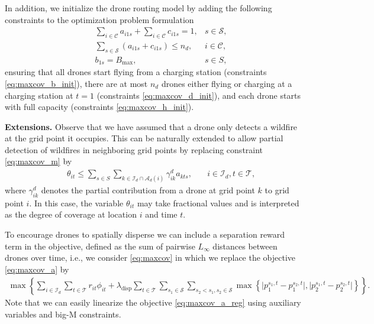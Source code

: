 \documentclass{article}
\newcommand{\set}[1]{\mathcal{#1}}
\begin{document}
In addition, we initialize the drone routing model by adding the following constraints to the optimization problem formulation
\begin{align}
    &\quad \displaystyle \sum_{i \in \set C} a_{i1s} + \sum_{i \in \set C} c_{i1s} = 1, &  s \in \set S, \label{eq:maxcov_b_init}\\
    &\quad \displaystyle \sum_{s \in \set S} (a_{i1s} + c_{i1s}) \leq n_d, & i \in \set C, \label{eq:maxcov_d_init}\\
    &\quad \displaystyle b_{1s} = B_{\text{max}}, & s \in S, \label{eq:maxcov_h_init}
\end{align}
ensuring that all drones start flying from a charging station (constraints \eqref{eq:maxcov_b_init}), there are at most $n_d$ drones either flying or charging at a charging station at $t = 1$ (constraints \eqref{eq:maxcov_d_init}), and each drone starts with full capacity (constraints \eqref{eq:maxcov_h_init}). 

\textbf{Extensions.}
Observe that we have assumed that a drone only detects a wildfire at the grid point it occupies. This can be naturally extended to allow partial detection of wildfires in neighboring grid points by replacing constraint \eqref{eq:maxcov_m} by 
\begin{align*}
            &\quad \displaystyle \theta_{it} \leq \sum_{s \in S} \sum_{k \in \set I_d \cap \set A_d(i)}\gamma_{ik}^d a_{kts}, &\quad i \in \set I_d, t \in \set T,
\end{align*}
where $\gamma_{ik}^d$ denotes the partial contribution from a drone at grid point $k$ to grid point $i$. In this case, the variable $\theta_{it}$ 
may take fractional values and is interpreted as the degree of coverage at location $i$ and time $t$.

To encourage drones to spatially disperse we can include a separation reward term in the objective, defined as the sum of pairwise $L_{\infty}$ distances between drones over time, i.e., we consider \eqref{eq:maxcov} in which we replace the objective \eqref{eq:maxcov_a} by
\begin{align} \label{eq:maxcov_a_reg}
    \max \left\{ \sum_{i \in \set I_d} \sum_{t \in \set T} r_{it} \phi_{it} + \lambda_{\text{disp}} \sum_{t \in \set T} \sum_{s_1 \in \set S} \sum_{s_2 < s_1, s_2 \in \set S} \max \left\{\big|p^{s_1,t}_1 - p^{s_2,t}_1\big|, \big|p^{s_1,t}_2 - p^{s_2,t}_2\big| \right\} \right\}. 
    \end{align}
Note that we can easily linearize the objective \eqref{eq:maxcov_a_reg} using auxiliary variables and big-M constraints.
\end{document}
